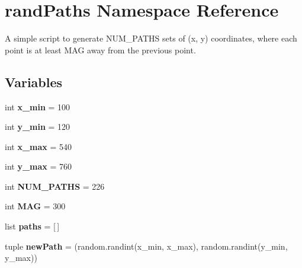 \hypertarget{namespacerand_paths}{\section{rand\+Paths Namespace Reference}
\label{namespacerand_paths}
}


A simple script to generate N\+U\+M\+\_\+\+P\+A\+T\+H\+S sets of (x, y) coordinates, where each point is at least M\+A\+G away from the previous point.  


\subsection*{Variables}
\begin{DoxyCompactItemize}
\item 
\hypertarget{namespacerand_paths_a99e494347b7964c809b0eaa84be9db8a}{int {\bfseries x\+\_\+min} = 100}\label{namespacerand_paths_a99e494347b7964c809b0eaa84be9db8a}

\item 
\hypertarget{namespacerand_paths_ad393ef592823a2b0960ebace67f95f93}{int {\bfseries y\+\_\+min} = 120}\label{namespacerand_paths_ad393ef592823a2b0960ebace67f95f93}

\item 
\hypertarget{namespacerand_paths_a61fa4733e6b6dfe99d7ac8ac1283f2f4}{int {\bfseries x\+\_\+max} = 540}\label{namespacerand_paths_a61fa4733e6b6dfe99d7ac8ac1283f2f4}

\item 
\hypertarget{namespacerand_paths_a9ba32f05214e3a18423b4dc656fd6b7f}{int {\bfseries y\+\_\+max} = 760}\label{namespacerand_paths_a9ba32f05214e3a18423b4dc656fd6b7f}

\item 
\hypertarget{namespacerand_paths_a805c72fef39a7701b8da5e30bd4b1803}{int {\bfseries N\+U\+M\+\_\+\+P\+A\+T\+H\+S} = 226}\label{namespacerand_paths_a805c72fef39a7701b8da5e30bd4b1803}

\item 
\hypertarget{namespacerand_paths_a6f6cf91ac467f4f55a206d7e8735f000}{int {\bfseries M\+A\+G} = 300}\label{namespacerand_paths_a6f6cf91ac467f4f55a206d7e8735f000}

\item 
\hypertarget{namespacerand_paths_a23a00fcf530b3b68f9d215d283200c6f}{list {\bfseries paths} = \mbox{[}$\,$\mbox{]}}\label{namespacerand_paths_a23a00fcf530b3b68f9d215d283200c6f}

\item 
\hypertarget{namespacerand_paths_a3a6a03a7e29dd80b9063dbdef923b54f}{tuple {\bfseries new\+Path} = (random.\+randint(x\+\_\+min, x\+\_\+max), random.\+randint(y\+\_\+min, y\+\_\+max))}\label{namespacerand_paths_a3a6a03a7e29dd80b9063dbdef923b54f}

\end{DoxyCompactItemize}


